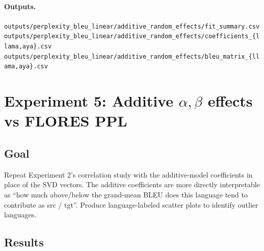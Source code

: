 \documentclass[11pt]{article}
\newcommand{\code}[1]{\texttt{\small #1}}
\begin{document}
\paragraph{Outputs.}

\code{outputs/perplexity\_bleu\_linear/additive\_random\_effects/fit\_summary.csv} \\
\code{outputs/perplexity\_bleu\_linear/additive\_random\_effects/coefficients\_\{llama,aya\}.csv} \\
\code{outputs/perplexity\_bleu\_linear/additive\_random\_effects/bleu\_matrix\_\{llama,aya\}.csv}

\section{Experiment 5: Additive $\alpha,\beta$ effects vs FLORES PPL}

\subsection{Goal}

Repeat Experiment 2's correlation study with the additive-model
coefficients in place of the SVD vectors. The additive coefficients are
more directly interpretable as ``how much above/below the grand-mean BLEU
does this language tend to contribute as src / tgt''. Produce
language-labeled scatter plots to identify outlier languages.

\subsection{Results}
\end{document}
